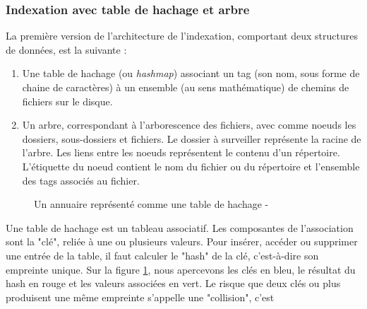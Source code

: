 \documentclass[a4paper, 12pt]{article}
\begin{document}
\subsubsection{Indexation avec table de hachage et arbre}\label{indexation_hashmap_arbre}
La première version de l'architecture de l'indexation, comportant deux structures 
de données, est la suivante :
\begin{enumerate}
    \item Une table de hachage (ou \textit{hashmap}) associant un tag (son nom, sous forme de 
        chaine de caractères) à un ensemble (au sens mathématique) de chemins de fichiers sur 
        le disque.
    \item Un arbre, correspondant à l'arborescence des fichiers, avec comme noeuds les dossiers, 
        sous-dossiers et fichiers. Le dossier à surveiller représente la racine de l'arbre.
        Les liens entre les noeuds représentent le contenu d'un répertoire. L'étiquette du noeud 
        contient le nom du fichier ou du répertoire et l'ensemble des tags associés au fichier.
\end{enumerate}
\begin{figure}
    \begin{center}
    \end{center}
    \caption{Un annuaire représenté comme une table de hachage - \cite{ref27}}
    \label{hashmap_wiki}
\end{figure}
Une table de hachage est un tableau associatif. Les composantes de l'association sont la "clé", 
reliée à une ou plusieurs valeurs. Pour insérer, accéder ou supprimer une entrée de la table, 
il faut calculer le "hash" de la clé, c'est-à-dire son empreinte unique. Sur la figure \ref{hashmap_wiki}, 
nous apercevons les clés en bleu, le résultat du hash en rouge et les valeurs associées en vert. 
Le risque que deux clés ou plus produisent une même empreinte s'appelle une "collision", c'est 
\end{document}
